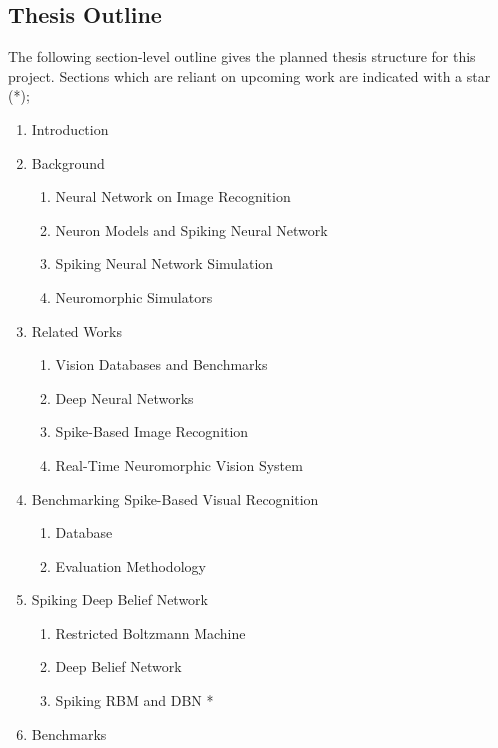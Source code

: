 \documentclass[journal]{journal}
\begin{document}
\begin{appendices}
	\section{Thesis Outline}
	\label{app:thesis}
	The following section-level outline gives the planned thesis structure for this project.
	Sections which are reliant on upcoming work are indicated with a star (*);
	\begin{enumerate}
		\item Introduction
		\item Background
			\begin{enumerate}
				\item Neural Network on Image Recognition
				\item Neuron Models and Spiking Neural Network
				\item Spiking Neural Network Simulation
				\item Neuromorphic Simulators
			\end{enumerate}	
		\item Related Works
			\begin{enumerate}
				\item Vision Databases and Benchmarks
				\item Deep Neural Networks
				\item Spike-Based Image Recognition
				\item Real-Time Neuromorphic Vision System
			\end{enumerate}
		\item Benchmarking Spike-Based Visual Recognition
			\begin{enumerate}
				\item Database
				\item Evaluation Methodology
			\end{enumerate}
		\item Spiking Deep Belief Network
			\begin{enumerate}
				\item Restricted Boltzmann Machine  
				\item Deep Belief Network
				\item Spiking RBM and DBN *
			\end{enumerate}	
		\item Benchmarks

\end{enumerate}
\end{appendices}
\end{document}
